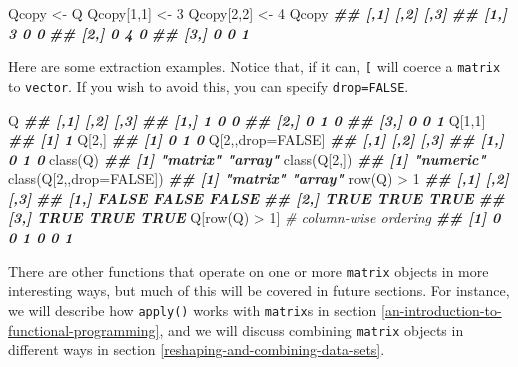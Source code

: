 \documentclass[
  12pt,
  krantz2]{krantz}
\makeatletter
\newenvironment{Shaded}{\begin{snugshade}}{\end{snugshade}}
\newcommand{\AttributeTok}[1]{\textcolor[rgb]{0.61,0.61,0.61}{#1}}
\newcommand{\CommentTok}[1]{\textcolor[rgb]{0.37,0.37,0.37}{\textit{#1}}}
\newcommand{\ConstantTok}[1]{\textcolor[rgb]{0,0,0}{#1}}
\newcommand{\DecValTok}[1]{\textcolor[rgb]{0.06,0.06,0.06}{#1}}
\newcommand{\DocumentationTok}[1]{\textcolor[rgb]{0.37,0.37,0.37}{\textbf{\textit{#1}}}}
\newcommand{\FunctionTok}[1]{\textcolor[rgb]{0,0,0}{#1}}
\newcommand{\NormalTok}[1]{#1}
\newcommand{\OtherTok}[1]{\textcolor[rgb]{0.37,0.37,0.37}{#1}}
\newcommand{\SpecialCharTok}[1]{\textcolor[rgb]{0,0,0}{#1}}
\newenvironment{kframe}{%
\medskip{}
\setlength{\fboxsep}{.8em}
 \def\at@end@of@kframe{}%
 \ifinner\ifhmode%
  \def\at@end@of@kframe{\end{minipage}}%
  \begin{minipage}{\columnwidth}%
 \fi\fi%
 \def\FrameCommand##1{\hskip\@totalleftmargin \hskip-\fboxsep
 \colorbox{shadecolor}{##1}\hskip-\fboxsep
     \hskip-\linewidth \hskip-\@totalleftmargin \hskip\columnwidth}%
 \MakeFramed {\advance\hsize-\width
   \@totalleftmargin\z@ \linewidth\hsize
   \@setminipage}}%
 {\par\unskip\endMakeFramed%
 \at@end@of@kframe}
\renewenvironment{Shaded}{\begin{kframe}}{\end{kframe}}
\makeatother
\begin{document}
\begin{Shaded}
\begin{Highlighting}[]
\NormalTok{Qcopy }\OtherTok{\textless{}{-}}\NormalTok{ Q}
\NormalTok{Qcopy[}\DecValTok{1}\NormalTok{,}\DecValTok{1}\NormalTok{] }\OtherTok{\textless{}{-}} \DecValTok{3}
\NormalTok{Qcopy[}\DecValTok{2}\NormalTok{,}\DecValTok{2}\NormalTok{] }\OtherTok{\textless{}{-}} \DecValTok{4}
\NormalTok{Qcopy}
\DocumentationTok{\#\#      [,1] [,2] [,3]}
\DocumentationTok{\#\# [1,]    3    0    0}
\DocumentationTok{\#\# [2,]    0    4    0}
\DocumentationTok{\#\# [3,]    0    0    1}
\end{Highlighting}
\end{Shaded}

Here are some extraction examples. Notice that, if it can, \texttt{{[}} will coerce a \texttt{matrix} to \texttt{vector}. If you wish to avoid this, you can specify \texttt{drop=FALSE}.

\begin{Shaded}
\begin{Highlighting}[]
\NormalTok{Q}
\DocumentationTok{\#\#      [,1] [,2] [,3]}
\DocumentationTok{\#\# [1,]    1    0    0}
\DocumentationTok{\#\# [2,]    0    1    0}
\DocumentationTok{\#\# [3,]    0    0    1}
\NormalTok{Q[}\DecValTok{1}\NormalTok{,}\DecValTok{1}\NormalTok{]}
\DocumentationTok{\#\# [1] 1}
\NormalTok{Q[}\DecValTok{2}\NormalTok{,]}
\DocumentationTok{\#\# [1] 0 1 0}
\NormalTok{Q[}\DecValTok{2}\NormalTok{,,drop}\OtherTok{=}\ConstantTok{FALSE}\NormalTok{]}
\DocumentationTok{\#\#      [,1] [,2] [,3]}
\DocumentationTok{\#\# [1,]    0    1    0}
\FunctionTok{class}\NormalTok{(Q)}
\DocumentationTok{\#\# [1] "matrix" "array"}
\FunctionTok{class}\NormalTok{(Q[}\DecValTok{2}\NormalTok{,])}
\DocumentationTok{\#\# [1] "numeric"}
\FunctionTok{class}\NormalTok{(Q[}\DecValTok{2}\NormalTok{,,}\AttributeTok{drop=}\ConstantTok{FALSE}\NormalTok{])  }
\DocumentationTok{\#\# [1] "matrix" "array"}
\FunctionTok{row}\NormalTok{(Q) }\SpecialCharTok{\textgreater{}} \DecValTok{1}
\DocumentationTok{\#\#       [,1]  [,2]  [,3]}
\DocumentationTok{\#\# [1,] FALSE FALSE FALSE}
\DocumentationTok{\#\# [2,]  TRUE  TRUE  TRUE}
\DocumentationTok{\#\# [3,]  TRUE  TRUE  TRUE}
\NormalTok{Q[}\FunctionTok{row}\NormalTok{(Q) }\SpecialCharTok{\textgreater{}} \DecValTok{1}\NormalTok{] }\CommentTok{\# column{-}wise ordering}
\DocumentationTok{\#\# [1] 0 0 1 0 0 1}
\end{Highlighting}
\end{Shaded}

There are other functions that operate on one or more \texttt{matrix} objects in more interesting ways, but much of this will be covered in future sections. For instance, we will describe how \texttt{apply()} works with \texttt{matrix}s in section \ref{an-introduction-to-functional-programming}, and we will discuss combining \texttt{matrix} objects in different ways in section \ref{reshaping-and-combining-data-sets}.
\end{document}
